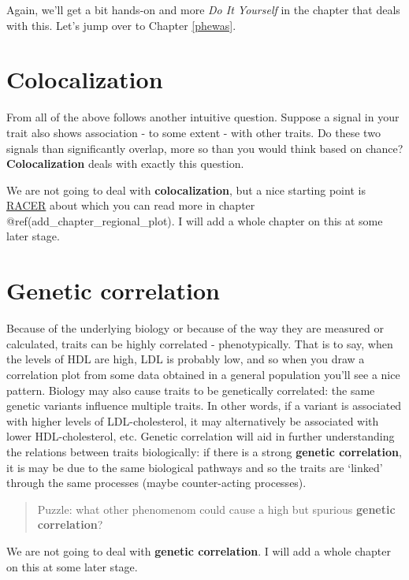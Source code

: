 \documentclass[
]{book}
\begin{document}
Again, we'll get a bit hands-on and more \emph{Do It Yourself} in the chapter that deals with this. Let's jump over to Chapter \ref{phewas}.

\hypertarget{colocalization}{%
\section{Colocalization}\label{colocalization}}

From all of the above follows another intuitive question. Suppose a signal in your trait also shows association - to some extent - with other traits. Do these two signals than significantly overlap, more so than you would think based on chance? \textbf{Colocalization} deals with exactly this question.

We are not going to deal with \textbf{colocalization}, but a nice starting point is \href{https://github.com/oliviasabik/RACER}{RACER} about which you can read more in chapter @ref(add\_chapter\_regional\_plot). I will add a whole chapter on this at some later stage.

\hypertarget{genetic-correlation}{%
\section{Genetic correlation}\label{genetic-correlation}}

Because of the underlying biology or because of the way they are measured or calculated, traits can be highly correlated - phenotypically. That is to say, when the levels of HDL are high, LDL is probably low, and so when you draw a correlation plot from some data obtained in a general population you'll see a nice pattern. Biology may also cause traits to be genetically correlated: the same genetic variants influence multiple traits. In other words, if a variant is associated with higher levels of LDL-cholesterol, it may alternatively be associated with lower HDL-cholesterol, etc. Genetic correlation will aid in further understanding the relations between traits biologically: if there is a strong \textbf{genetic correlation}, it is may be due to the same biological pathways and so the traits are `linked' through the same processes (maybe counter-acting processes).

\begin{quote}
Puzzle: what other phenomenom could cause a high but spurious \textbf{genetic correlation}?
\end{quote}

We are not going to deal with \textbf{genetic correlation}. I will add a whole chapter on this at some later stage.
\end{document}
